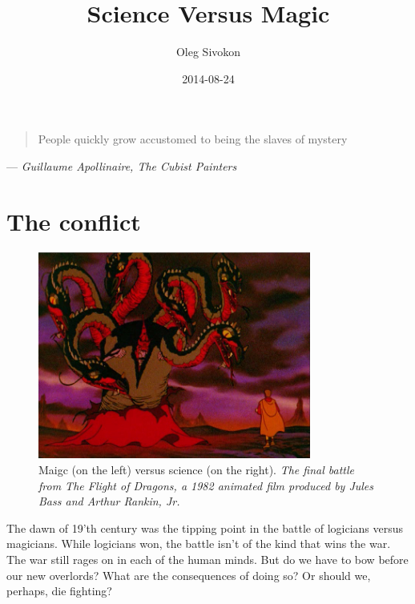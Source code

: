 \documentclass[11pt]{article}
\author{Oleg Sivokon}
\date{2014-08-24}
\title{Science Versus Magic}
\begin{document}
\maketitle
\tableofcontents


\newpage

\begin{quote}
  People quickly grow accustomed to being the slaves of mystery
\end{quote}

\begin{flushright}
  --- \emph{Guillaume Apollinaire, The Cubist Painters}
\end{flushright}

\newpage

\section{The conflict}
\label{sec-1}

\begin{figure}[h!]
  \centering
  \includegraphics[width=0.8\textwidth]{./the-flight-of-dragons.png}
  \caption[Magic vs Science]{
    \ssmall Maigc (on the left) versus science (on the right).
    \textit{The final battle from The Flight of Dragons,
      a 1982 animated film produced by Jules Bass and Arthur Rankin, Jr.}}
\end{figure}

The dawn of 19'th century was the tipping point in the battle of logicians
versus magicians.  While logicians won, the battle isn't of the kind that wins
the war.  The war still rages on in each of the human minds.  But do we have
to bow before our new overlords?  What are the consequences of doing so?
Or should we, perhaps, die fighting?
\end{document}
